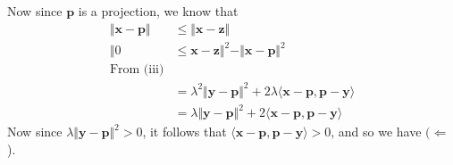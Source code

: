 \documentclass{article}
\newcommand{\inprod}[1]{\langle #1 \rangle}
\begin{document}
	Now since $\mathbf{p}$ is a projection, we know that 
	\begin{align*}
	\Vert \mathbf{x} - \mathbf{p} \Vert &\leq \Vert \mathbf{x} - \mathbf{z} \Vert \\
	\Vert 0 &\leq \mathbf{x} - \mathbf{z} \Vert^2 - \Vert \mathbf{x} - \mathbf{p} \Vert^2 \\
	\text{From (iii)} \\
	&= \lambda^2 \Vert \mathbf{y} - \mathbf{p} \Vert^2 + 2 \lambda \inprod{\mathbf{x} - \mathbf{p}, \mathbf{p} - \mathbf{y}}  \\
	&= \lambda \Vert \mathbf{y} - \mathbf{p} \Vert^2 + 2 \inprod{\mathbf{x} - \mathbf{p}, \mathbf{p} - \mathbf{y}}
	\end{align*}
	Now since $\lambda \Vert \mathbf{y} - \mathbf{p} \Vert^2 > 0$, it follows that $\inprod{\mathbf{x} - \mathbf{p}, \mathbf{p} - \mathbf{y}} > 0$, and so we have $(\Leftarrow$).
	
\end{document}
